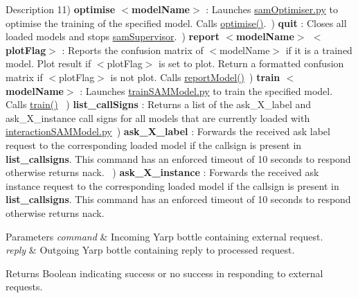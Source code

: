 \begin{DoxyParagraph}{Description}
 11) {\bfseries optimise $<$model\+Name$>$} \+: Launches \hyperlink{samOptimiser_8py}{sam\+Optimiser.\+py} to optimise the training of the specified model. Calls \hyperlink{group__icubclient__SAM__Core_a78a19d8b34c5f62c2d6b52aedfe8d937}{optimise()}.~) {\bfseries quit} \+: Closes all loaded models and stops \hyperlink{namespaceSAM_1_1SAM__Core_1_1samSupervisor}{sam\+Supervisor}.~) {\bfseries report $<$model\+Name$>$ $<$plot\+Flag$>$} \+: Reports the confusion matrix of $<$model\+Name$>$ if it is a trained model. Plot result if $<$plot\+Flag$>$ is set to {\ttfamily plot}. Return a formatted confusion matrix if $<$plot\+Flag$>$ is not {\ttfamily plot}. Calls \hyperlink{group__icubclient__SAM__Core_a810140960cafeed884a09f69ec5f6025}{report\+Model()}~) {\bfseries train $<$model\+Name$>$} \+: Launches \hyperlink{trainSAMModel_8py}{train\+S\+A\+M\+Model.\+py} to train the specified model. Calls \hyperlink{group__icubclient__SAM__Core_ae075c7cfe2fd460b85dd278373fd8edb}{train()} ~) {\bfseries list\+\_\+call\+Signs} \+: Returns a list of the {\ttfamily ask\+\_\+\+X\+\_\+label} and {\ttfamily ask\+\_\+\+X\+\_\+instance} call signs for all models that are currently loaded with \hyperlink{interactionSAMModel_8py}{interaction\+S\+A\+M\+Model.\+py}~) {\bfseries ask\+\_\+\+X\+\_\+label} \+: Forwards the received ask label request to the corresponding loaded model if the callsign is present in {\bfseries list\+\_\+callsigns}. This command has an enforced timeout of 10 seconds to respond otherwise returns {\ttfamily nack}. ~) {\bfseries ask\+\_\+\+X\+\_\+instance} \+: Forwards the received ask instance request to the corresponding loaded model if the callsign is present in {\bfseries list\+\_\+callsigns}. This command has an enforced timeout of 10 seconds to respond otherwise returns {\ttfamily nack}. ~\newline

\end{DoxyParagraph}

\begin{DoxyParams}{Parameters}
{\em command} & Incoming Yarp bottle containing external request. \\
\hline
{\em reply} & Outgoing Yarp bottle containing reply to processed request.\\
\hline
\end{DoxyParams}
\begin{DoxyReturn}{Returns}
Boolean indicating success or no success in responding to external requests. 
\end{DoxyReturn}


